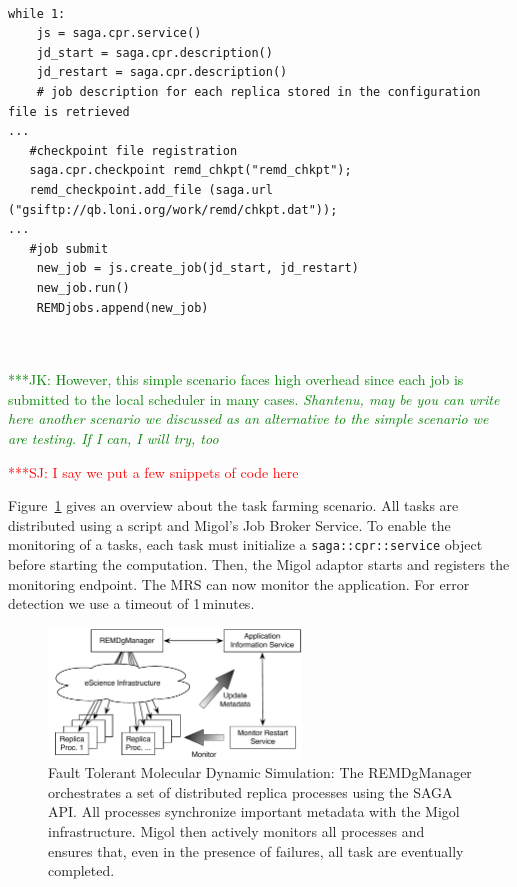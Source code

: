 \documentclass[times, 10pt,twocolumn]{article}
\newcommand{\kimnote}[1]{ {\textcolor{green} { ***JK: #1 }}}
\newcommand{\jhanote}[1]{ {\textcolor{red} { ***SJ: #1 }}}
\begin{document}
\begin{lstlisting}[style=myListing, caption={Python snippets: Register Checkpoint with Migol}, 
label={lst:python_saga_chkpt_reg}]

while 1:
    js = saga.cpr.service() 
    jd_start = saga.cpr.description()
    jd_restart = saga.cpr.description()
    # job description for each replica stored in the configuration file is retrieved
...
   #checkpoint file registration
   saga.cpr.checkpoint remd_chkpt("remd_chkpt");
   remd_checkpoint.add_file (saga.url ("gsiftp://qb.loni.org/work/remd/chkpt.dat"));
...   
   #job submit
    new_job = js.create_job(jd_start, jd_restart)
    new_job.run()
    REMDjobs.append(new_job)
    


\end{lstlisting}

\kimnote{However, this simple scenario faces high overhead since each job is submitted to the local scheduler in many cases. \it Shantenu, may be you can write here another scenario we discussed as an alternative to the simple scenario we are testing.  If I can, I will try, too } 



\jhanote{I say we put a few snippets of code here}

\label{sec:exp}       
        
Figure~\ref{fig:saga-taskfarming} gives an overview about the task farming scenario. All tasks are
distributed using a script and Migol's Job Broker Service.
To enable the monitoring of a tasks, each task must initialize a \texttt{saga::cpr::service} object 
before starting the computation.  Then, the Migol adaptor starts and registers the monitoring endpoint. 
The MRS can now monitor the application.  For error detection we use a timeout of 1\,minutes.

\begin{figure}[t]
    \centering
        \includegraphics[width=0.6\textwidth]{saga-taskfarming}
    \caption{Fault Tolerant Molecular Dynamic Simulation: The REMDgManager orchestrates a set of distributed replica processes using the SAGA API. All processes synchronize important metadata with the Migol infrastructure. Migol then actively monitors all processes and ensures that, even in the presence of failures, all task are eventually completed.}
    \label{fig:saga-taskfarming}
\end{figure} 
\end{document}
